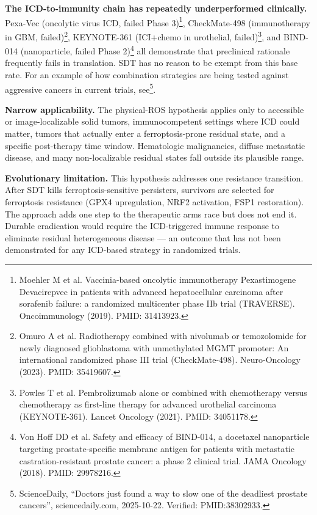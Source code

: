 \documentclass[11pt,twoside,openright]{report}
\begin{document}
\textbf{The ICD-to-immunity chain has repeatedly underperformed clinically.} Pexa-Vec (oncolytic virus ICD, failed Phase 3)\footnote{Moehler M et al. Vaccinia-based oncolytic immunotherapy Pexastimogene Devacirepvec in patients with advanced hepatocellular carcinoma after sorafenib failure: a randomized multicenter phase IIb trial (TRAVERSE). Oncoimmunology (2019). PMID: 31413923.}, CheckMate-498 (immunotherapy in GBM, failed)\footnote{Omuro A et al. Radiotherapy combined with nivolumab or temozolomide for newly diagnosed glioblastoma with unmethylated MGMT promoter: An international randomized phase III trial (CheckMate-498). Neuro-Oncology (2023). PMID: 35419607.}, KEYNOTE-361 (ICI+chemo in urothelial, failed)\footnote{Powles T et al. Pembrolizumab alone or combined with chemotherapy versus chemotherapy as first-line therapy for advanced urothelial carcinoma (KEYNOTE-361). Lancet Oncology (2021). PMID: 34051178.}, and BIND-014 (nanoparticle, failed Phase 2)\footnote{Von Hoff DD et al. Safety and efficacy of BIND-014, a docetaxel nanoparticle targeting prostate-specific membrane antigen for patients with metastatic castration-resistant prostate cancer: a phase 2 clinical trial. JAMA Oncology (2018). PMID: 29978216.} all demonstrate that preclinical rationale frequently fails in translation. SDT has no reason to be exempt from this base rate. For an example of how combination strategies are being tested against aggressive cancers in current trials, see\footnote{ScienceDaily, ``Doctors just found a way to slow one of the deadliest prostate cancers'', sciencedaily.com, 2025-10-22. Verified: PMID:38302933.}.

\textbf{Narrow applicability.} The physical-ROS hypothesis applies only to accessible or image-localizable solid tumors, immunocompetent settings where ICD could matter, tumors that actually enter a ferroptosis-prone residual state, and a specific post-therapy time window. Hematologic malignancies, diffuse metastatic disease, and many non-localizable residual states fall outside its plausible range.

\textbf{Evolutionary limitation.} This hypothesis addresses one resistance transition. After SDT kills ferroptosis-sensitive persisters, survivors are selected for ferroptosis resistance (GPX4 upregulation, NRF2 activation, FSP1 restoration). The approach adds one step to the therapeutic arms race but does not end it. Durable eradication would require the ICD-triggered immune response to eliminate residual heterogeneous disease --- an outcome that has not been demonstrated for any ICD-based strategy in randomized trials.
\end{document}
